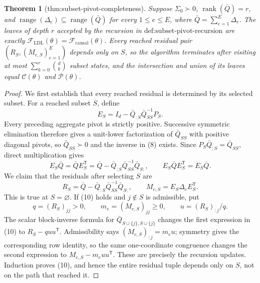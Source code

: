 \documentclass{article}
\newtheorem{theorem}{Theorem}
\begin{document}
\begin{theorem}[thm:subset-pivot-completeness]\label{thm:subset-pivot-completeness}
Suppose \(\Sigma_0\succ0\), \(\operatorname{rank}(\bar Q)=r\), and \(\operatorname{range}(\Delta_e)\subseteq\operatorname{range}(\bar Q)\) for every \(1\le e\le E\), where \(\bar Q=\sum_{e=1}^E\Delta_e\).  The leaves of depth \(r\) accepted by the recursion in \(\text{def:subset-pivot-recursion}\) are exactly \(\mathcal F_{\mathrm{LDL}}(\theta)=\mathcal F_{\mathrm{causal}}(\theta)\).  Every reached residual pair \((R_S,(M_{e,S})_{e=1}^{E})\) depends only on \(S\), so the algorithm terminates after visiting at most \(\sum_{k=0}^{r}\binom{d}{k}\) subset states, and the intersection and union of its leaves equal \(\mathcal C(\theta)\) and \(\mathcal P(\theta)\).
\end{theorem}
\begin{proof}
We first establish that every reached residual is determined by its selected subset.  For a reached subset \(S\), define
\[
 E_S=I_d-\bar Q_{:S}\bar Q_{SS}^{-1}P_S. \tag{8}
\]
Every preceding aggregate pivot is strictly positive.  Successive symmetric elimination therefore gives a unit-lower factorization of \(\bar Q_{SS}\) with positive diagonal pivots, so \(\bar Q_{SS}\succ0\) and the inverse in (8) exists.  Since \(P_S\bar Q_{:S}=\bar Q_{SS}\), direct multiplication gives
\[
 E_S\bar Q=\bar QE_S^{\mathsf T}
 =\bar Q-\bar Q_{:S}\bar Q_{SS}^{-1}\bar Q_{S:},
 \qquad E_S\bar QE_S^{\mathsf T}=E_S\bar Q. \tag{9}
\]
We claim that the residuals after selecting \(S\) are
\[
 R_S=\bar Q-\bar Q_{:S}\bar Q_{SS}^{-1}\bar Q_{S:},
 \qquad M_{e,S}=E_S\Delta_eE_S^{\mathsf T}. \tag{10}
\]
This is true at \(S=\varnothing\).  If (10) holds and \(j\notin S\) is admissible, put
\[
 q=(R_S)_{jj}>0,\qquad m_e=(M_{e,S})_{jj}\ge0,\qquad
 u=(R_S)_{:j}/q.
\]
The scalar block-inverse formula for \(\bar Q_{S\cup\{j\},S\cup\{j\}}\) changes the first expression in (10) to \(R_S-quu^{\mathsf T}\).  Admissibility says \((M_{e,S})_{:j}=m_eu\); symmetry gives the corresponding row identity, so the same one-coordinate congruence changes the second expression to \(M_{e,S}-m_euu^{\mathsf T}\).  These are precisely the recursion updates.  Induction proves (10), and hence the entire residual tuple depends only on \(S\), not on the path that reached it.


\end{proof}
\end{document}
